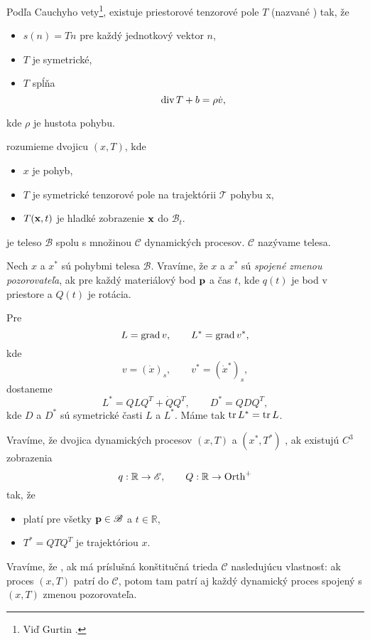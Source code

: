Podľa Cauchyho vety\footnote{Viď Gurtin \cite[s. 101]{gurtin}.}, 
existuje priestorové tenzorové pole $T$ (nazvané ) tak, že 
\begin{itemize}
 \item $s(n)=Tn$ pre každý jednotkový vektor $n$,
 \item $T$ je symetrické,
 \item $T$ spĺňa  $$\mbox{div}\,T+b=\rho\dot v,$$  
\end{itemize}
kde $\rho$ je hustota pohybu.

 rozumieme dvojicu $(x,T)$, kde 
\begin{itemize}
 \item $x$ je pohyb,
 \item $T$ je symetrické tenzorové pole na trajektórii $\mathcal T$ pohybu x,
 \item $T(\textbf{x},t)$ je hladké zobrazenie $\textbf{x}$ do $\mathcal B_t$.
\end{itemize}

 je teleso $\mathcal B$ spolu s množinou $\mathcal C$ 
dynamických procesov. $\mathcal C$ nazývame  telesa.

Nech $x$ a $x^*$ sú pohybmi telesa $\mathcal B$. 
Vravíme, že $x$ a $x^*$ sú {\it spojené zmenou pozorovateľa}, ak
pre každý materiálový bod $\textbf{p}$ a čas $t$, kde $q(t)$ je bod v priestore a
$Q(t)$ je rotácia. 

Pre $$L=\mbox{grad}\,v, \qquad L^*=\mbox{grad}\,v^*,$$ kde 
$$v=(\dot x)_s, \qquad v^*=(\dot x^*)_s,$$ dostaneme
$$L^*=QLQ^T+\dot{Q}Q^T,\qquad D^*=QDQ^T,$$ kde $D$ a $D^*$ sú symetrické
časti $L$ a $L^*$. Máme tak $\mbox{tr}\,L^*=\mbox{tr}\,L$.

Vravíme, že dvojica dynamických procesov $(x,T)$ a $(x^*,T^*)$ 
, ak existujú $C^3$ zobrazenia 
$$q:\mathbb R\rightarrow\mathcal E, \qquad Q:\mathbb R\rightarrow\mbox{Orth}^+$$
tak, že
\begin{itemize}
	\item {} platí pre všetky $\textbf{p}\in\mathcal B$ a $t\in\mathbb R$,
	\item $T^*=QTQ^T$ je trajektóriou $x$.
\end{itemize}

Vravíme, že , ak
má príslušná konštitučná trieda $\mathcal C$ nasledujúcu vlastnosť: ak proces
$(x,T)$ patrí do $\mathcal C$, potom tam patrí aj každý dynamický proces spojený
s $(x,T)$ zmenou pozorovateľa.

